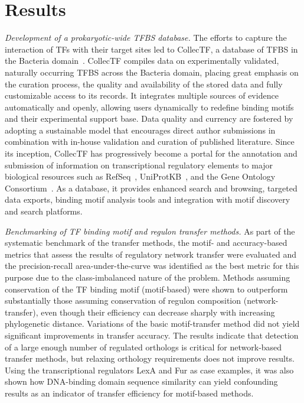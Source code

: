 \section{Results}

\textit{Development of a prokaryotic-wide TFBS database.}  The efforts to
capture the interaction of TFs with their target sites led to CollecTF, a
database of TFBS in the Bacteria domain~\cite{kilic2013collectf,
  kilicc2016data}. CollecTF compiles data on experimentally validated,
naturally occurring TFBS across the Bacteria domain, placing great emphasis on
the curation process, the quality and availability of the stored data and fully
customizable access to its records. It integrates multiple sources of evidence
automatically and openly, allowing users dynamically to redefine binding motifs
and their experimental support base. Data quality and currency are fostered by
adopting a sustainable model that encourages direct author submissions in
combination with in-house validation and curation of published
literature. Since its inception, CollecTF has progressively become a portal for
the annotation and submission of information on transcriptional regulatory
elements to major biological resources such as RefSeq~\cite{o2015reference},
UniProtKB~\cite{uniprot2014uniprot}, and the Gene Ontology
Consortium~\cite{gene2013gene}. As a database, it provides enhanced search and
browsing, targeted data exports, binding motif analysis tools and integration
with motif discovery and search platforms.

\textit{Benchmarking of TF binding motif and regulon transfer methods.}
As part of the systematic benchmark of the transfer methods, the motif- and
accuracy-based metrics that assess the results of regulatory network transfer
were evaluated and the precision-recall area-under-the-curve was identified as
the best metric for this purpose due to the class-imbalanced nature of the
problem. Methods assuming conservation of the TF binding motif (motif-based)
were shown to outperform substantially those assuming conservation of regulon
composition (network-transfer), even though their efficiency can decrease
sharply with increasing phylogenetic distance. Variations of the basic
motif-transfer method did not yield significant improvements in transfer
accuracy. The results indicate that detection of a large enough number of
regulated orthologs is critical for network-based transfer methods, but
relaxing orthology requirements does not improve results. Using the
transcriptional regulators LexA and Fur as case examples, it was also shown how
DNA-binding domain sequence similarity can yield confounding results as an
indicator of transfer efficiency for motif-based methods.

